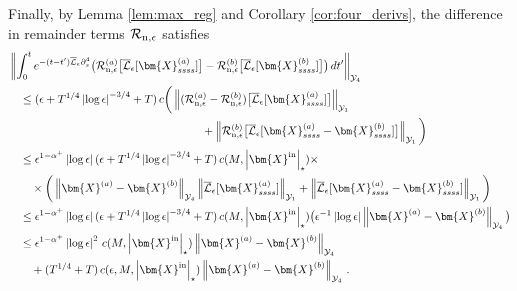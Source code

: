 \documentclass[11pt,reqno]{amsart}
\newcommand{\X}{\bm{X}}
\newcommand{\p}{\partial}
\newcommand{\abs}[1]{\left\lvert #1 \right\rvert}
\newcommand{\norm}[1]{\left\lVert #1 \right\rVert}
\newcommand{\mc}[1]{\mathcal{#1}}
\theoremstyle{definition}
\begin{document}
%
%
Finally, by Lemma \ref{lem:max_reg} and Corollary \ref{cor:four_derivs}, the difference in remainder terms $\mc{R}_{\rm n,\epsilon}$ satisfies 
\begin{equation}
\begin{aligned}
  &\norm{\int_0^t e^{-(t-t')\overline{\mc{L}}_\epsilon\p_s^4}\big(\mc{R}_{\rm n,\epsilon}^{(a)}\big[\overline{\mc{L}}_\epsilon[\X_{ssss}^{(a)}]\big]-\mc{R}_{\rm n,\epsilon}^{(b)}\big[\overline{\mc{L}}_\epsilon[\X_{ssss}^{(b)}]\big]\big)\,dt'}_{\mc{Y}_4}\\
  &\quad \le (\epsilon+T^{1/4}\abs{\log\epsilon}^{-3/4}+T)\,c\bigg(
  \norm{(\mc{R}_{\rm n,\epsilon}^{(a)}-\mc{R}_{\rm n,\epsilon}^{(b)})\big[\overline{\mc{L}}_\epsilon[\X_{ssss}^{(a)}]\big]}_{\mc{Y}_1}\\
  &\hspace{6cm}  + 
  \norm{\mc{R}_{\rm n,\epsilon}^{(b)}\big[\overline{\mc{L}}_\epsilon[\X_{ssss}^{(a)}-\X_{ssss}^{(b)}]\big]}_{\mc{Y}_1}\bigg) \\
  &\quad \le \epsilon^{1-\alpha^+}\abs{\log\epsilon}(\epsilon+T^{1/4}\abs{\log\epsilon}^{-3/4}+T)\,c(M,\abs{\X^{\rm in}}_\star)\times\\
  &\qquad \times\bigg(\norm{\X^{(a)}-\X^{(b)}}_{\mc{Y}_4} \norm{\overline{\mc{L}}_\epsilon[\X_{ssss}^{(a)}]}_{\mc{Y}_1}
  + \norm{\overline{\mc{L}}_\epsilon[\X_{ssss}^{(a)}-\X_{ssss}^{(b)}]}_{\mc{Y}_1}\bigg)\\
  &\quad \le \epsilon^{1-\alpha^+}\abs{\log\epsilon}(\epsilon+T^{1/4}\abs{\log\epsilon}^{-3/4}+T)\,c(M,\abs{\X^{\rm in}}_\star)\big(\epsilon^{-1}\abs{\log\epsilon}\norm{\X^{(a)}-\X^{(b)}}_{\mc{Y}_4}\big)\\
  &\quad \le \epsilon^{1-\alpha^+}\abs{\log\epsilon}^2\,c(M,\abs{\X^{\rm in}}_\star)\norm{\X^{(a)}-\X^{(b)}}_{\mc{Y}_4}\\
  &\qquad +(T^{1/4}+T)\,c(\epsilon,M,\abs{\X^{\rm in}}_\star)\norm{\X^{(a)}-\X^{(b)}}_{\mc{Y}_4}\,.
\end{aligned}
\end{equation}
\end{document}
